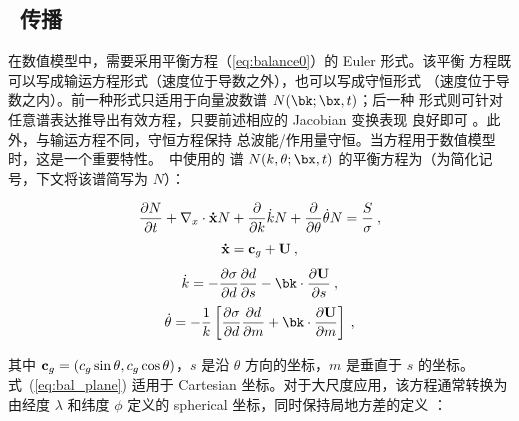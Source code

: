 \vssub
\subsection{~传播}
\vssub

在数值模型中，需要采用平衡方程（\ref{eq:balance0}）的 Euler 形式。该平衡
方程既可以写成输运方程形式（速度位于导数之外），也可以写成守恒形式
（速度位于导数之内）。前一种形式只适用于向量波数谱 $N(\bk;\bx,t)$；后一种
形式则可针对任意谱表达推导出有效方程，只要前述相应的 Jacobian 变换表现
良好即可 \citep[例如][]{tol:GAOS98b}。此外，与输运方程不同，守恒方程保持
总波能/作用量守恒。当方程用于数值模型时，这是一个重要特性。\ws\ 中使用的
谱 $N(k,\theta;\bx,t)$ 的平衡方程为（为简化记号，下文将该谱简写为 $N$）：


\begin{equation}
\frac{\partial N}{\partial t} + \nabla_x \cdot {\bf\dot{x}}N +
\frac{\partial}{\partial k} \dot{k}N +
\frac{\partial}{\partial \theta} \dot{\theta}N =
\frac{S}{\sigma} \: , \label{eq:bal_plane}
\end{equation}
\begin{equation}
{\bf \dot{x}} = {\bf c}_g + {\bf U} \: , \label{eq:x_dot}
\end{equation}
\begin{equation}
\dot{k} = - \frac{\partial \sigma}{\partial d}
\frac{\partial d}{\partial s} - {\bk} \cdot
\frac{\partial {\bf U}}{\partial s} \: , \label{eq:k_dot}
\end{equation}
\begin{equation}
\dot{\theta} = - \frac{1}{k} \left [
\frac{\partial \sigma}{\partial d} \frac{\partial d}{\partial m}
+ {\bk} \cdot \frac{\partial {\bf U}}{\partial m}
\right ] \: , \label{eq:theta_dot}
\end{equation}

\noindent
其中 ${\bf c}_g = (c_g \sin \theta, c_g \cos \theta)$，$s$ 是沿
$\theta$ 方向的坐标，$m$ 是垂直于 $s$ 的坐标。式~(\ref{eq:bal_plane})
适用于 Cartesian 坐标。对于大尺度应用，该方程通常转换为由经度 $\lambda$
和纬度 $\phi$ 定义的 spherical 坐标，同时保持局地方差的定义
\citep[即单位表面积上的方差，如][]{art:WAM88}：


